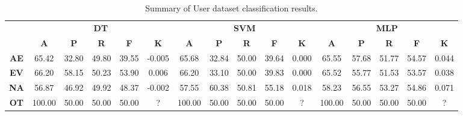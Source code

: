\begin{landscape}
\begin{table}[htbp]
\footnotesize
\centering
\caption{Summary of User dataset classification results.}
\label{tab:base_female}
\begin{tabular}{|c|c|c|c|c|c|c|c|c|c|c|c|c|c|c|c|}
\hline
\multirow{2}{*}{}	& \multicolumn{5}{c|}{\textbf{DT}}												& \multicolumn{5}{c|}{\textbf{SVM}}												& \multicolumn{5}{c|}{\textbf{MLP}}												\\ \cline{2-16} 
					& \textbf{A}	& \textbf{P}	& \textbf{R}	& \textbf{F}	& \textbf{K}	& \textbf{A}	& \textbf{P}	& \textbf{R}	& \textbf{F}	& \textbf{K}	& \textbf{A}	& \textbf{P}	& \textbf{R}	& \textbf{F}	& \textbf{K}	\\ \hline
\textbf{AE}			& 65.42			& 32.80			& 49.80			& 39.55			& -0.005			& 65.68			& 32.84			& 50.00			& 39.64			& 0.000			& 65.55			& 57.68			& 51.77			& 54.57			& 0.044			\\ \hline
\textbf{EV}			& 66.20			& 58.15			& 50.23			& 53.90			& 0.006			& 66.20			& 33.10			& 50.00			& 39.83			& 0.000			& 65.52			& 55.77			& 51.53			& 53.57			& 0.038			\\ \hline
\textbf{NA}			& 56.87			& 46.92			& 49.92			& 48.37			& -0.002			& 57.55			& 60.38			& 50.81			& 55.18			& 0.018			& 58.23			& 56.55			& 53.27			& 54.86			& 0.071			\\ \hline
\textbf{OT}			& 100.00			& 50.00			& 50.00			& 50.00			& ?			& 100.00			& 50.00			& 50.00			& 50.00			& ?			& 100.00			& 50.00			& 50.00			& 50.00			& ?			\\ \hline
\end{tabular}
\end{table}
\end{landscape}